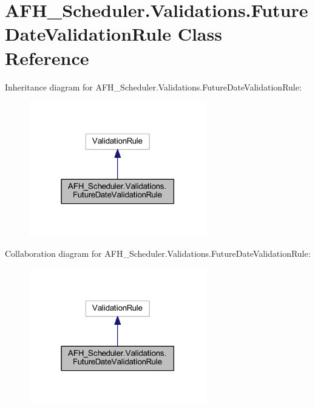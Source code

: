 \section{A\+F\+H\+\_\+\+Scheduler.\+Validations.\+Future\+Date\+Validation\+Rule Class Reference}
\label{class_a_f_h___scheduler_1_1_validations_1_1_future_date_validation_rule}


Inheritance diagram for A\+F\+H\+\_\+\+Scheduler.\+Validations.\+Future\+Date\+Validation\+Rule\+:
\nopagebreak
\begin{figure}[H]
\begin{center}
\leavevmode
\includegraphics[width=219pt]{class_a_f_h___scheduler_1_1_validations_1_1_future_date_validation_rule__inherit__graph}
\end{center}
\end{figure}


Collaboration diagram for A\+F\+H\+\_\+\+Scheduler.\+Validations.\+Future\+Date\+Validation\+Rule\+:
\nopagebreak
\begin{figure}[H]
\begin{center}
\leavevmode
\includegraphics[width=219pt]{class_a_f_h___scheduler_1_1_validations_1_1_future_date_validation_rule__coll__graph}
\end{center}
\end{figure}
